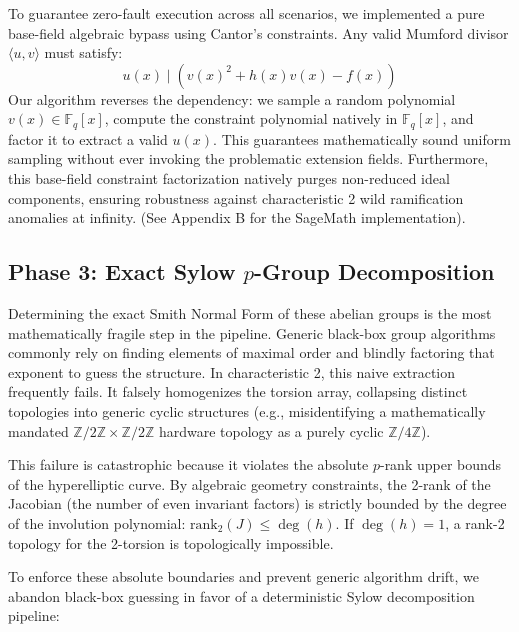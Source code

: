\documentclass[letterpaper, 11pt]{article}
\begin{document}
To guarantee zero-fault execution across all scenarios, we implemented a pure base-field algebraic bypass using Cantor's constraints. Any valid Mumford divisor $\langle u, v \rangle$ must satisfy:
\begin{equation}
    u(x) \mid \left( v(x)^2 + h(x)v(x) - f(x) \right)
\end{equation}
Our algorithm reverses the dependency: we sample a random polynomial $v(x) \in \mathbb{F}_q[x]$, compute the constraint polynomial natively in $\mathbb{F}_q[x]$, and factor it to extract a valid $u(x)$. This guarantees mathematically sound uniform sampling without ever invoking the problematic extension fields. Furthermore, this base-field constraint factorization natively purges non-reduced ideal components, ensuring robustness against characteristic 2 wild ramification anomalies at infinity. (See Appendix B for the SageMath implementation).

\subsection{Phase 3: Exact Sylow \texorpdfstring{$p$}{p}-Group Decomposition}
Determining the exact Smith Normal Form of these abelian groups is the most mathematically fragile step in the pipeline. Generic black-box group algorithms commonly rely on finding elements of maximal order and blindly factoring that exponent to guess the structure. In characteristic 2, this naive extraction frequently fails. It falsely homogenizes the torsion array, collapsing distinct topologies into generic cyclic structures (e.g., misidentifying a mathematically mandated $\mathbb{Z}/2\mathbb{Z} \times \mathbb{Z}/2\mathbb{Z}$ hardware topology as a purely cyclic $\mathbb{Z}/4\mathbb{Z}$). 

This failure is catastrophic because it violates the absolute $p$-rank upper bounds of the hyperelliptic curve. By algebraic geometry constraints, the 2-rank of the Jacobian (the number of even invariant factors) is strictly bounded by the degree of the involution polynomial: $\text{rank}_2(J) \le \deg(h)$. If $\deg(h) = 1$, a rank-2 topology for the 2-torsion is topologically impossible.

To enforce these absolute boundaries and prevent generic algorithm drift, we abandon black-box guessing in favor of a deterministic Sylow decomposition pipeline:
\end{document}
